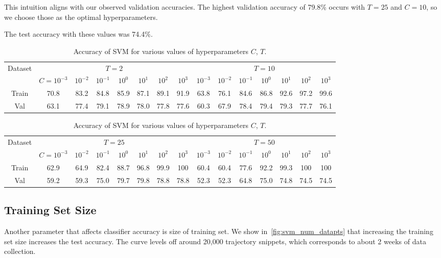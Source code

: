 This intuition aligns with our observed validation accuracies.
The highest validation accuracy of 79.8\% occurs with $T=25$ and $C=10$, so we choose those as the optimal hyperparameters.

The test accuracy with these values was 74.4\%.

\begin{table}[ht!]
\centering
\begin{tabular}{||c| c c c c c c c| c c c c c c c||}  
 \hline
 \multirow{2}{*}{Dataset} &
       \multicolumn{7}{c|}{$T=2$} &
       \multicolumn{7}{c||}{$T=10$} \\
 & $C=10^{-3}$ & $10^{-2}$ & $10^{-1}$ & $10^{0}$ & $10^{1}$ & $10^{2}$ & $10^{3}$ & $10^{-3}$ & $10^{-2}$ & $10^{-1}$ & $10^{0}$ & $10^{1}$ & $10^{2}$ & $10^{3}$ \\ [0.5ex] 
 \hline\hline
 Train & 70.8 & 83.2 & 84.8 & 85.9 & 87.1 & 89.1 & 91.9 & 63.8 & 76.1 & 84.6 & 86.8 & 92.6 & 97.2 & 99.6  \\ \hline
 Val & 63.1 & 77.4 & 79.1 & 78.9 & 78.0 & 77.8 & 77.6 & 60.3 & 67.9 & 78.4 & 79.4 & 79.3 & 77.7 & 76.1  \\ \hline
\end{tabular}
\begin{tabular}{||c| c c c c c c c| c c c c c c c||}  
 \hline
 \multirow{2}{*}{Dataset} &
       \multicolumn{7}{c|}{$T=25$} &
       \multicolumn{7}{c||}{$T=50$} \\
 & $C=10^{-3}$ & $10^{-2}$ & $10^{-1}$ & $10^{0}$ & $10^{1}$ & $10^{2}$ & $10^{3}$ & $10^{-3}$ & $10^{-2}$ & $10^{-1}$ & $10^{0}$ & $10^{1}$ & $10^{2}$ & $10^{3}$ \\ [0.5ex] 
 \hline\hline
 Train & 62.9 & 64.9 & 82.4 & 88.7 & 96.8 & 99.9 & 100 & 60.4 & 60.4 & 77.6 & 92.2 & 99.3 & 100 & 100  \\ \hline
 Val & 59.2 & 59.3 & 75.0 & 79.7 & 79.8 & 78.8 & 78.8 & 52.3 & 52.3 & 64.8 & 75.0 & 74.8 & 74.5 & 74.5  \\ \hline
\end{tabular}
\caption{Accuracy of SVM for various values of hyperparameters $C$, $T$.}
\label{table_svm}
\end{table}

\subsection{Training Set Size}
Another parameter that affects classifier accuracy is size of training set.
We show in~\cref{fig:svm_num_datapts} that increasing the training set size increases the test accuracy.
The curve levels off around 20,000 trajectory snippets, which corresponds to about 2 weeks of data collection.


